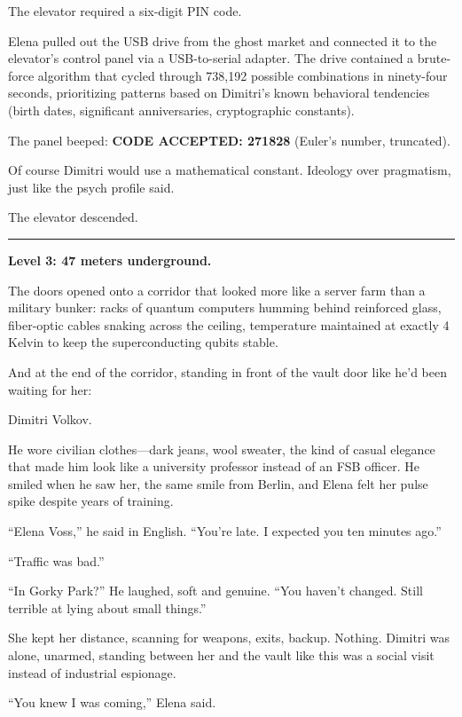 \documentclass[12pt,letterpaper]{book}
\begin{document}
The elevator required a six-digit PIN code.

Elena pulled out the USB drive from the ghost market and connected it to the elevator's control panel via a USB-to-serial adapter. The drive contained a brute-force algorithm that cycled through 738,192 possible combinations in ninety-four seconds, prioritizing patterns based on Dimitri's known behavioral tendencies (birth dates, significant anniversaries, cryptographic constants).

The panel beeped: \textbf{CODE ACCEPTED: 271828} (Euler's number, truncated).

Of course Dimitri would use a mathematical constant. Ideology over pragmatism, just like the psych profile said.

The elevator descended.

\begin{center}\rule{0.5\linewidth}{0.5pt}\end{center}

\textbf{Level 3: 47 meters underground.}

The doors opened onto a corridor that looked more like a server farm than a military bunker: racks of quantum computers humming behind reinforced glass, fiber-optic cables snaking across the ceiling, temperature maintained at exactly 4 Kelvin to keep the superconducting qubits stable.

And at the end of the corridor, standing in front of the vault door like he'd been waiting for her:

Dimitri Volkov.

He wore civilian clothes---dark jeans, wool sweater, the kind of casual elegance that made him look like a university professor instead of an FSB officer. He smiled when he saw her, the same smile from Berlin, and Elena felt her pulse spike despite years of training.

``Elena Voss,'' he said in English. ``You're late. I expected you ten minutes ago.''

``Traffic was bad.''

``In Gorky Park?'' He laughed, soft and genuine. ``You haven't changed. Still terrible at lying about small things.''

She kept her distance, scanning for weapons, exits, backup. Nothing. Dimitri was alone, unarmed, standing between her and the vault like this was a social visit instead of industrial espionage.

``You knew I was coming,'' Elena said.
\end{document}
